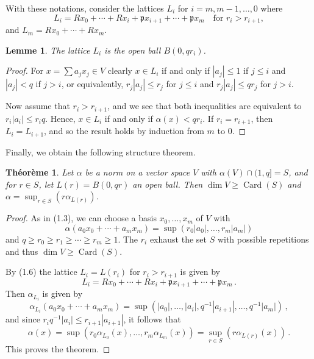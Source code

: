 \documentclass[12pt,a4paper]{article}
\theoremstyle{plain}
\newtheorem{theorem}{Th\'eor\`eme}[section]
\newtheorem{lemma}{Lemme}[section]
\theoremstyle{definition}
\theoremstyle{remark}
\DeclareMathOperator{\Card}{Card}
\begin{document}
With these notations, consider the lattices $L_i$ for $i = m, m-1, \ldots, 0$ 
where
\[
L_i = Rx_0 + \cdots + Rx_i + \mathfrak{p}x_{i+1} + \cdots + \mathfrak{p}x_m \quad\text{for } r_i > r_{i+1},
\]
and $L_m = Rx_0 + \cdots + Rx_m$.

\begin{lemma}
The lattice $L_i$ is the open ball $B(0, qr_i)$.
\end{lemma}

\begin{proof}
For $x = \sum a_j x_j \in V$ clearly $x \in L_i$ if and only if $|a_j| \leqslant 1$ 
if $j \leqslant i$ and $|a_j| < q$ if $j > i$, or equivalently, $r_j|a_j| \leqslant r_j$ 
for $j \leqslant i$ and $r_j|a_j| \leqslant qr_j$ for $j > i$.

Now assume that $r_i > r_{i+1}$, and we see that both inequalities are 
equivalent to $r_i|a_i| \leqslant r_i q$. Hence, $x \in L_i$ if and only if 
$\alpha(x) < qr_i$. If $r_i = r_{i+1}$, then $L_i = L_{i+1}$, and so the 
result holds by induction from $m$ to $0$.
\end{proof}

Finally, we obtain the following structure theorem.

\begin{theorem}
Let $\alpha$ be a norm on a vector space $V$ with $\alpha(V) \cap (1,q] = S$, 
and for $r \in S$, let $L(r) = B(0,qr)$ an open ball. Then 
$\dim V \geqslant \Card(S)$ and $\alpha = \sup_{r \in S}(r\alpha_{L(r)})$.
\end{theorem}

\begin{proof}
As in (1.3), we can choose a basis $x_0, \ldots, x_m$ of $V$ with
\[
\alpha(a_0 x_0 + \cdots + a_m x_m) = \sup(r_0|a_0|, \ldots, r_m|a_m|)
\]
and $q \geqslant r_0 \geqslant r_1 \geqslant \cdots \geqslant r_m \geqslant 1$. The $r_i$ exhaust 
the set $S$ with possible repetitions and thus $\dim V \geqslant \Card(S)$.

By (1.6) the lattice $L_i = L(r_i)$ for $r_i > r_{i+1}$ is given by
\[
L_i = Rx_0 + \cdots + Rx_i + \mathfrak{p}x_{i+1} + \cdots + \mathfrak{p}x_m \,.
\]
Then $\alpha_{L_i}$ is given by
\[
\alpha_{L_i}(a_0 x_0 + \cdots + a_m x_m) = \sup(|a_0|, \ldots, |a_i|, q^{-1}|a_{i+1}|, \ldots, q^{-1}|a_m|) \,,
\]
and since $r_i q^{-1}|a_i| \leqslant r_{i+1}|a_{i+1}|$, it follows that
\[
\alpha(x) = \sup(r_0\alpha_{L_0}(x), \ldots, r_m\alpha_{L_m}(x)) = \sup_{r \in S}(r\alpha_{L(r)}(x)) \,.
\]
This proves the theorem.
\end{proof}
\end{document}
